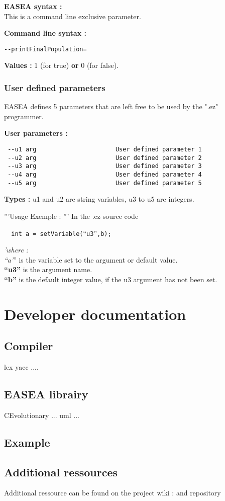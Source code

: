 \documentclass{book}
\begin{document}
\textbf{EASEA syntax :}\\This is a command line exclusive parameter.

\textbf{Command line syntax :}

\texttt{-{}-printFinalPopulation=}

\textbf{Values :} 1 (for true) \textbf{or} 0 (for false).

\subsection{User defined parameters}\label{user-defined-parameters}

EASEA defines 5 parameters that are left free to be used by the ".ez"
programmer.

\textbf{User parameters :}

\texttt{~-{}-u1~arg~~~~~~~~~~~~~~~~~~~~~~User~defined~parameter~1}\\\texttt{~-{}-u2~arg~~~~~~~~~~~~~~~~~~~~~~User~defined~parameter~2}\\\texttt{~-{}-u3~arg~~~~~~~~~~~~~~~~~~~~~~User~defined~parameter~3}\\\texttt{~-{}-u4~arg~~~~~~~~~~~~~~~~~~~~~~User~defined~parameter~4}\\\texttt{~-{}-u5~arg~~~~~~~~~~~~~~~~~~~~~~User~defined~parameter~5}

\textbf{Types :} u1 and u2 are string variables, u3 to u5 are integers.

'''Usage Exemple : ''' In the .ez source code

\texttt{~~int~a~=~setVariable(}``\texttt{u3}''\texttt{,b);}

\emph{'where : \textbf{\\}``a''}' is the variable set to the argument or
default value.\\\textbf{``u3''} is the argument name.\\\textbf{``b''} is
the default integer value, if the u3 argument has not been set.

\chapter{Developer documentation} %
\label{sec:Developer documentation}
\section{Compiler} %
\label{sub:Compiler}
  lex yacc .... 
  \section{EASEA librairy} %
  \label{sub:EASEA library}
  CEvolutionary ... uml ...

\section{Example} %
\label{sec:example}


\section{Additional ressources} %
\label{sec:Additional}
Additional ressource can be found on the project wiki : and repository 
\end{document}
